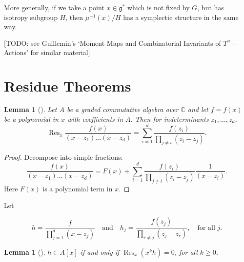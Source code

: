 \documentclass{article}
\newtheorem{lemma}[theorem]{Lemma}
\newcommand{\CC}{\mathbb{C}}
\newcommand{\mfg}{\mathfrak{g}}
\DeclareMathOperator{\Res}{Res}
\begin{document}
	More generally, if we take a point $x \in \mfg^{\ast}$ which is not fixed by $G$, but has isotropy subgroup $H$, then $\mu^{-1}(x)/H$ has a symplectic structure in the same way.
	
	[TODO: see Guillemin's `Moment Maps and Combinatorial Invariants of $T^{n}$ -Actions' for similar material]
	
	
	
	
	
	
	
	
	
	
	
	
	
	
	
	
	
	
	
	
	\section{Residue Theorems}
	
	\begin{lemma}[\cite{Guillemin1999}]\label{residue:1}
		Let $A$ be a graded commutative algebra over $\CC$ and let $f = f(x)$ be a polynomial in $x$ with coefficients in $A$. Then for indeterminants $z_{1}, \ldots, z_{d}$,
		\begin{equation*}
			\Res_{x} \frac{f(x)}{(x - z_{1})\ldots(x - z_{d})} = \sum\limits_{i = 1}^{d}\frac{f(z_{i})}{\prod_{j \neq i}(z_{i} - z_{j})}.
		\end{equation*}
	\end{lemma}
	
	\begin{proof}
		Decompose into simple fractions:
		\begin{equation*}
			\frac{f(x)}{(x - z_{1})\ldots(x - z_{d})} = F(x) + \sum\limits_{i = 1}^{d} \frac{f(z_{i})}{\prod_{j \neq i} (z_{i} - z_{j})} \frac{1}{(x - z_{i})}.
		\end{equation*}
		Here $F(x)$ is a polynomial term in $x$.
	\end{proof}
	
	Let
	
	\begin{equation*}
		h = \frac{f}{ \prod_{j = 1}^{d}(x - z_{j}) } \quad \text{and} \quad h_{j} = \frac{f(z_{j})}{\prod_{r \neq j}(z_{j} - z_{r})}, \quad \text{for all } j.
	\end{equation*}
	
	\begin{lemma}[\cite{Guillemin1999}]\label{residue:2}
		$h \in A[x]$ if and only if $\Res_{x}(x^{k}h) = 0$, for all $k \geq 0$.
	\end{lemma}
	
\end{document}
